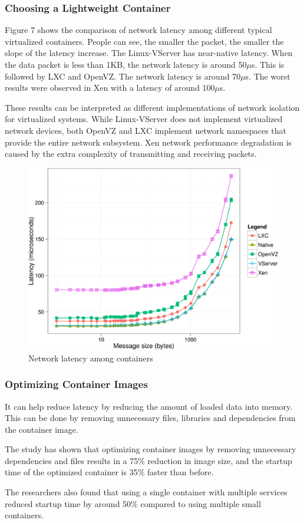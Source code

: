 \subsubsection{Choosing a Lightweight Container}
Figure 7 shows the comparison of network latency among different typical
virtualized containers. People can see, the smaller the packet, the smaller the slope of the latency increase.
The Linux-VServer has near-native latency.
When the data packet is less than 1KB, the network latency is around 50{$\mu$s}.
This is followed by LXC and OpenVZ. The network latency is around 70{$\mu$s}.
The worst results were observed in Xen with a latency of around 100{$\mu$s}.

These results can be interpreted as different implementations of network
isolation for virtualized systems. While Linux-VServer does not implement
virtualized network devices, both OpenVZ and LXC implement network namespaces
that provide the entire network subsystem. Xen network performance degradation is
caused by the extra complexity of transmitting and receiving packets.\cite{b8}

\begin{figure}[h!]
    \centering
    \includegraphics[width=.35\textwidth]{pics/container-delay}
    \caption{Network latency among containers\cite{b8}}
\end{figure}


\subsubsection{Optimizing Container Images}
It can help reduce latency by reducing the amount of loaded data into memory.
This can be done by removing unnecessary files, libraries and
dependencies from the container image.

The study \cite{b29} has shown that optimizing container images by removing unnecessary dependencies and
files results in a 75\% reduction in image size, and the startup time of the optimized
container is 35\% faster than before.

The researchers also found that using a single container with multiple services reduced
startup time by around 50\% compared to using multiple small containers.\cite{b29}


